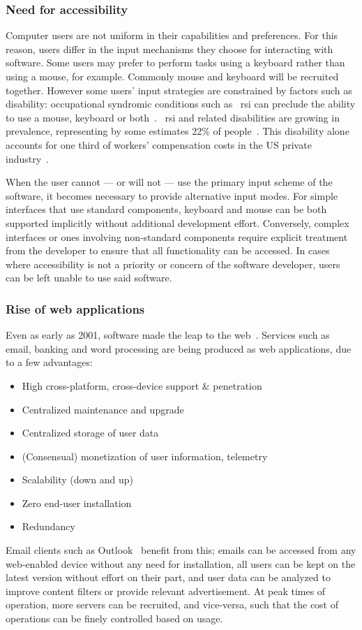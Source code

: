 \documentclass[11pt,openright,a4paper]{report}
\begin{document}
\subsubsection{Need for accessibility}
Computer users are not uniform in their capabilities and preferences. For this reason, users differ in the input mechanisms they choose for interacting with software. Some users may prefer to perform tasks using a keyboard rather than using a mouse, for example. Commonly mouse and keyboard will be recruited together. However some users' input strategies are constrained by factors such as disability: occupational syndromic conditions such as ~\gls{rsi} can preclude the ability to use a mouse, keyboard or both~\cite{trewin1999keyboard}. ~\gls{rsi} and related disabilities are growing in prevalence, representing by some estimates 22\% of people~\cite{rsiprevalence}. This disability alone accounts for one third of workers' compensation costs in the US private industry~\cite{barr2002pathophysiological}.

When the user cannot --- or will not --- use the primary input scheme of the software, it becomes necessary to provide alternative input modes. For simple interfaces that use standard components, keyboard and mouse can be both supported implicitly without additional development effort. Conversely, complex interfaces or ones involving non-standard components require explicit treatment from the developer to ensure that all functionality can be accessed. In cases where accessibility is not a priority or concern of the software developer, users can be left unable to use said software.

\subsubsection{Rise of web applications}
Even as early as 2001, software made the leap to the web~\cite{ginige2001web}. Services such as email, banking and word processing are being produced as web applications, due to a few advantages:
\begin{itemize}
  \item High cross-platform, cross-device support \& penetration
  \item Centralized maintenance and upgrade
  \item Centralized storage of user data
  \item (Consensual) monetization of user information, telemetry
  \item Scalability (down and up)
  \item Zero end-user installation
  \item Redundancy
\end{itemize}
Email clients such as Outlook~\cite{outlookcom} benefit from this; emails can be accessed from any web-enabled device without any need for installation, all users can be kept on the latest version without effort on their part, and user data can be analyzed to improve content filters or provide relevant advertisement. At peak times of operation, more servers can be recruited, and vice-versa, such that the cost of operations can be finely controlled based on usage.
\end{document}

